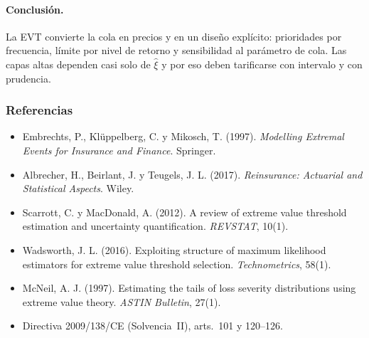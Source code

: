 \documentclass[a4paper,12pt]{article}
\begin{document}
\paragraph{Conclusi\'on.} La EVT convierte la cola en precios y en un dise\~no explícito: prioridades por frecuencia, l\'imite por nivel de retorno y sensibilidad al par\'ametro de cola. Las capas altas dependen casi solo de $\hat\xi$ y por eso deben tarificarse con intervalo y con prudencia.

\subsubsection*{Referencias}
\begin{itemize}[leftmargin=*,itemsep=0pt]
\item Embrechts, P., Kl\"uppelberg, C. y Mikosch, T. (1997). \emph{Modelling Extremal Events for Insurance and Finance}. Springer.
\item Albrecher, H., Beirlant, J. y Teugels, J. L. (2017). \emph{Reinsurance: Actuarial and Statistical Aspects}. Wiley.
\item Scarrott, C. y MacDonald, A. (2012). A review of extreme value threshold estimation and uncertainty quantification. \emph{REVSTAT}, 10(1).
\item Wadsworth, J. L. (2016). Exploiting structure of maximum likelihood estimators for extreme value threshold selection. \emph{Technometrics}, 58(1).
\item McNeil, A. J. (1997). Estimating the tails of loss severity distributions using extreme value theory. \emph{ASTIN Bulletin}, 27(1).
\item Directiva 2009/138/CE (Solvencia~II), arts.~101 y 120--126.
\end{itemize}
\end{document}
